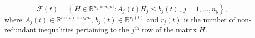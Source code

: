 \documentclass[10 pt, letterpaper]{article}
\newcommand{\beq}{\begin{equation}}
\newcommand{\eeq}{\end{equation}}
\newcommand{\bR}{{\mathbb R}}
\begin{document}
\beq\label{Eq:FSS_representation}
\mathcal{F}(t)\!=\! \left\{H\!\in\!\bR^{n_y \times n_um}\!:\!A_j(t)H_{j}\leq b_j(t),\, j=1,\hdots, n_y \right\},
\eeq
where $A_j(t) \in \bR^{r_j(t) \times n_um}$, $b_j(t) \in \bR^{r_j(t)}$ and $r_j(t)$ is the number of non-redundant inequalities pertaining to the $j^\text{th}$ row of the matrix $H$.\\
\end{document}
